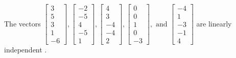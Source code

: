 \begin{exercise}
\begin{exerciseStatement}
  \end{exerciseStatement}
  \begin{exerciseAnswer}
   The vectors \(\left[\begin{array}{r}
3 \\
5 \\
3 \\
1 \\
-6
\end{array}\right] , \left[\begin{array}{r}
-2 \\
-5 \\
4 \\
-5 \\
1
\end{array}\right] , \left[\begin{array}{r}
4 \\
3 \\
-4 \\
-4 \\
2
\end{array}\right] , \left[\begin{array}{r}
0 \\
0 \\
1 \\
0 \\
-3
\end{array}\right] , \text{ and } \left[\begin{array}{r}
-4 \\
1 \\
-3 \\
-1 \\
4
\end{array}\right]\) are 
  	 linearly independent  .
  


  \end{exerciseAnswer}
\end{exercise}